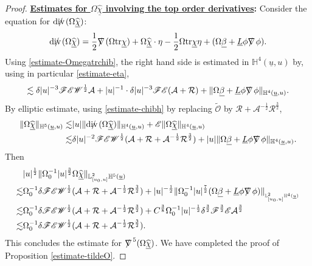 \documentclass[11pt,reqno]{amsart}
\theoremstyle{definition}
\numberwithin{equation}{section}
\newcommand{\tr}{\mathrm{tr}}
\renewcommand{\L}{\mathbb{L}}
\renewcommand{\H}{\mathbb{H}}
\def\betab{\underline{\beta}}
\def\chib{\underline{\chi}}
\def\chibh{\widehat{\underline{\chi}}}
\def\Lb{\underline{L}}
\def\tr{\mathrm{tr}}
\def\ub{\underline{u}}
\def\nablas{\mbox{$\nabla \mkern -13mu /$ }}
\def\divs{\mbox{$\mathrm{div} \mkern -13mu /$ }}
\def\ds{\mbox{$\nabla \mkern -13mu /$ }}
\begin{document}
\begin{proof}
{\bf \underline{Estimates for $\Omega\chibh$ involving the top order derivatives}:} Consider the equation for $\divs(\Omega\chibh)$:
\begin{equation}\label{equ-divschibh}
\divs(\Omega\chibh)=\frac{1}{2}\ds(\Omega\tr \chib)+\Omega\chibh\cdot\eta-\frac{1}{2}\Omega\tr \chib\eta+(\Omega\betab+\Lb\phi\ds\phi).\end{equation}
Using \eqref{estimate-Omegatrchib}, the right hand side is estimated in $\H^4(\ub,u)$ by, using in particular \eqref{estimate-eta},
\begin{align*}
\lesssim\delta|u|^{-3}\mathscr{F}\mathscr{E}\mathscr{W}^{\frac{1}{2}}\mathcal{A}+|u|^{-1}\cdot\delta|u|^{-3}\mathscr{F}\mathscr{E}(\mathcal{A}+\mathcal{R})+\|\Omega\betab+\Lb\phi\nablas\phi\|_{\H^4(\ub,u)}.
\end{align*}
By elliptic estimate, using \eqref{estimate-chibh} by replacing $\widetilde{\mathcal{O}}$ by $\mathcal{R}+\mathcal{A}^{-\frac{1}{2}}\mathcal{R}^{\frac{3}{2}}$,
\begin{align*}
\|\Omega\chibh\|_{\H^5(\ub,u)}\lesssim&|u|\|\divs(\Omega\chibh)\|_{\H^4(\ub,u)}+\mathscr{E}\|\Omega\chibh\|_{\H^4(\ub,u)}\\
\lesssim&\delta|u|^{-2}\mathscr{F}\mathscr{E}\mathscr{W}^{\frac{1}{2}}(\mathcal{A}+\mathcal{R}+\mathcal{A}^{-\frac{1}{2}}\mathcal{R}^{\frac{3}{2}})+|u|\|\Omega\betab+\Lb\phi\nablas\phi\|_{\H^4(\ub,u)}.
\end{align*}
Then
\begin{equation}\label{estimate-Omegachibh}
\begin{split}
&|u|^{\frac{1}{2}}\|\Omega_0^{-1}|u|^{\frac{3}{2}}\Omega\chibh\|_{\L^2_{[u_0,u]}\H^5(\ub)}\\
\lesssim&\Omega_0^{-1}\delta\mathscr{F}\mathscr{E}\mathscr{W}^{\frac{1}{2}}(\mathcal{A}+\mathcal{R}+\mathcal{A}^{-\frac{1}{2}}\mathcal{R}^{\frac{3}{2}})+|u|^{-\frac{1}{2}}\|\Omega_0^{-1}|u|^{\frac{7}{2}}(\Omega\betab+\Lb\phi\nablas\phi)\|_{_{\L^2_{[u_0,u]}\H^4(\ub)}}\\
\lesssim&\Omega_0^{-1}\delta\mathscr{F}\mathscr{E}\mathscr{W}^{\frac{1}{2}}(\mathcal{A}+\mathcal{R}+\mathcal{A}^{-\frac{1}{2}}\mathcal{R}^{\frac{3}{2}})+C^{\frac{3}{8}}\Omega_0^{-1}|u|^{-\frac{1}{2}}\delta^{\frac{3}{2}}\mathscr{F}^{\frac{3}{2}}\mathscr{E}\mathcal{A}^{\frac{3}{2}}\\
\lesssim&\Omega_0^{-1}\delta\mathscr{F}\mathscr{E}\mathscr{W}^{\frac{1}{2}}(\mathcal{A}+\mathcal{R}+\mathcal{A}^{-\frac{1}{2}}\mathcal{R}^{\frac{3}{2}}).
\end{split}
\end{equation}
This concludes the estimate for $\nablas^5(\Omega\chibh)$.
We have completed the proof of Proposition \ref{estimate-tildeO}.


\end{proof}
\end{document}
